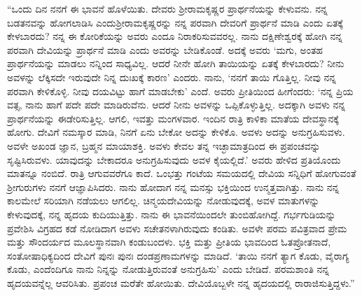 “ಒಂದು ದಿನ ನನಗೆ ಈ ಭಾವನೆ ಹೊಳೆಯಿತು. ದೇವರು ಶ‍್ರೀರಾಮಕೃಷ್ಣರ ಪ್ರಾರ್ಥನೆಯನ್ನು ಕೇಳುವನು. ನನ್ನ ಬಡತನವನ್ನು ಹೋಗಲಾಡಿಸಿ ಎಂದು\break ಶ‍್ರೀರಾಮಕೃಷ್ಣರನ್ನು ನನ್ನ ಪರವಾಗಿ ದೇವರಿಗೆ ಪ್ರಾರ್ಥನೆ ಮಾಡಿ ಎಂದು ಏತಕ್ಕೆ ಕೇಳಬಾರದು? ನನ್ನ ಈ ಕೋರಿಕೆಯನ್ನು ಅವರು ಎಂದೂ ನಿರಾಕರಿಸುವವರಲ್ಲ. ನಾನು ದಕ್ಷಿಣೇಶ್ವರಕ್ಕೆ ಹೋಗಿ ನನ್ನ ಪರವಾಗಿ ದೇವಿಯನ್ನು ಪ್ರಾರ್ಥನೆ ಮಾಡಿ ಎಂದು ಅವರನ್ನು ಬೇಡಿಕೊಂಡೆ. ಅದಕ್ಕೆ ಅವರು ‘ಮಗು, ಅಂತಹ ಪ್ರಾರ್ಥನೆಯನ್ನು ಮಾಡಲು ನನ್ನಿಂದ ಸಾಧ್ಯವಿಲ್ಲ. ಆದರೆ ನೀನೇ ಹೋಗಿ ತಾಯಿಯನ್ನು ಏತಕ್ಕೆ ಕೇಳಬಾರದು? ನೀನು ಅವಳನ್ನು ಲೆಕ್ಕಿಸದೇ ಇರುವುದೇ ನಿನ್ನ ದುಃಖಕ್ಕೆ ಕಾರಣ’ ಎಂದರು. ನಾನು, ‘ನನಗೆ ತಾಯಿ ಗೊತ್ತಿಲ್ಲ. ನೀವು ನನ್ನ ಪರವಾಗಿ ಕೇಳಿಕೊಳ್ಳಿ. ನೀವು ದಯವಿಟ್ಟು ಹಾಗೆ ಮಾಡಬೇಕು’ ಎಂದೆ. ಅವರು ಪ್ರೀತಿಯಿಂದ ಹೀಗೆಂದರು: ‘ನನ್ನ ಪ್ರಿಯ ವತ್ಸ, ನಾನು ಹಾಗೆ ಪದೇ ಪದೇ ಮಾಡಿರುವೆನು. ಆದರೆ ನೀನು ಅವಳನ್ನು ಒಪ್ಪಿಕೊಳ್ಳುತ್ತಿಲ್ಲ. ಅದಕ್ಕಾಗಿ ಅವಳು ನನ್ನ ಪ್ರಾರ್ಥನೆಯನ್ನು ಈಡೇರಿಸುತ್ತಿಲ್ಲ. ಆಗಲಿ, ಇವತ್ತು ಮಂಗಳವಾರ. ಇಂದಿನ ರಾತ್ರಿ ಕಾಳಿಕಾ ಮಾತೆಯ ದೇವಸ್ಥಾನಕ್ಕೆ ಹೋಗು. ದೇವಿಗೆ ನಮಸ್ಕಾರ ಮಾಡಿ, ನಿನಗೆ ಏನು ಬೇಕೋ ಅದನ್ನು ಕೇಳಿಕೊ. ಅವಳು ಅದನ್ನು ಅನುಗ್ರಹಿಸುವಳು. ಅವಳೇ ಅಖಂಡ ಜ್ಞಾನ, ಬ್ರಹ್ಮನ ಮಾಯಾಶಕ್ತಿ. ಅವಳು ಕೇವಲ ತನ್ನ ಇಚ್ಛಾಮಾತ್ರದಿಂದ ಈ ಪ್ರಪಂಚವನ್ನು ಸೃಷ್ಟಿಸಿರುವಳು. ಯಾವುದನ್ನು ಬೇಕಾದರೂ ಅನುಗ್ರಹಿಸುವುದು ಅವಳ ಕೈಯಲ್ಲಿದೆ.’ ಅವರು ಹೇಳಿದ ಪ್ರತಿಯೊಂದು ಮಾತನ್ನೂ ನಂಬಿದೆ. ರಾತ್ರಿ ಆಗುವವರೆಗೂ ಕಾದೆ. ಒಂಭತ್ತು ಗಂಟೆಯ ಸಮಯದಲ್ಲಿ ದೇವಿಯ ಸನ್ನಿಧಿಗೆ ಹೋಗುವಂತೆ ಶ‍್ರೀಗುರುಗಳು ನನಗೆ ಆಜ್ಞಾಪಿಸಿದರು. ನಾನು ಹೋದಾಗ ನನ್ನ ಮನಸ್ಸು ಭಕ್ತಿಯಿಂದ ಉನ್ಮತ್ತವಾಗಿತ್ತು. ನಾನು ನನ್ನ ಕಾಲಮೇಲೆ ಸರಿಯಾಗಿ ನಡೆಯಲು ಆಗಲಿಲ್ಲ. ಚಿನ್ಮಯದೇವಿಯನ್ನು ನೋಡುವುದಕ್ಕೆ, ಅವಳ ಮಾತುಗಳನ್ನು ಕೇಳುವುದಕ್ಕೆ, ನನ್ನ ಹೃದಯ ಕುದಿಯುತ್ತಿತ್ತು. ನಾನು ಈ ಭಾವನೆಯಿಂದಲೇ ತುಂಬಿಹೋಗಿದ್ದೆ. ಗರ್ಭಗುಡಿಯನ್ನು ಪ್ರವೇಶಿಸಿ ವಿಗ್ರಹದ ಕಡೆ ನೋಡಿದಾಗ ಅವಳು ಸಚೇತನಳಾಗಿರುವುದು ಕಂಡಿತು. ಅವಳೇ ಪರಮ ಪವಿತ್ರವಾದ ಪ್ರೇಮ ಮತ್ತು ಸೌಂದರ್ಯದ ಮೂಲಸ್ಥಾನವಾಗಿ ಕಂಡುಬಂದಳು. ಭಕ್ತಿ ಮತ್ತು ಪ್ರೀತಿಯ ಭಾವದಿಂದ ಓತಪ್ರೋತನಾದೆ, ಸಂತೋಷಾಧಿಕ್ಯದಿಂದ ದೇವಿಗೆ ಪುನಃ ಪುನಃ ದಂಡಪ್ರಣಾಮಗಳನ್ನು ಮಾಡಿದೆ. ‘ತಾಯಿ ನನಗೆ ತ್ಯಾಗ ಕೊಡು, ವೈರಾಗ್ಯ ಕೊಡು, ಎಂದೆಂದಿಗೂ ನಾನು ನಿನ್ನನ್ನು ನೋಡುತ್ತಿರುವಂತೆ ಅನುಗ್ರಹಿಸು’ ಎಂದು ಬೇಡಿದೆ. ಪರಮಶಾಂತಿ ನನ್ನ ಹೃದಯವನ್ನೆಲ್ಲ ಆವರಿಸಿತು. ಪ್ರಪಂಚ ಮರೆತೇ ಹೋಯಿತು. ದೇವಿಯೊಬ್ಬಳೇ ನನ್ನ ಹೃದಯದಲ್ಲಿ ರಾರಾಜಿಸುತ್ತಿದ್ದಳು.”

